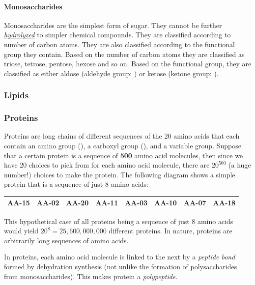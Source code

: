 \documentclass[12pt]{article}
\begin{document}
\paragraph{Monosaccharides}
Monosaccharides are the simplest form of sugar. They cannot be further \hyperref[sec: hydrolysis]{\emph{hydrolyzed}} to simpler chemical compounds. They are classified according to number of carbon atoms. They are also classified according to the functional group they contain. Based on the number of carbon atoms they are classified as triose, tetrose, pentose, hexose and so on. Based on the functional group, they are classified as either aldose (aldehyde group: ) or ketose (ketone group: ).
\subsubsection{Lipids}
\subsubsection{Proteins}
Proteins are long chains of different sequences of the 20 amino acids that each contain an amino group (), a carboxyl group (), and a variable group. Suppose that a certain protein is a sequence of \textbf{500} amino acid molecules, then since we have 20 choices to pick from for each amino acid molecule, there are $20^{500}$ (a huge number!) choices to make the protein. The following diagram shows a simple protein that is a sequence of just 8 amino acids: 
\begin{table}[htbp!]
  \begin{center}
    \begin{tabular}{|c|c|c|c|c|c|c|c|} 
      \hline
        AA-15 &
        AA-02 &
        AA-20 &
        AA-11 &
        AA-03 &
        AA-10 &
        AA-07 &
        AA-18 \\
        \hline
    \end{tabular}
  \end{center}
\end{table}
This hypothetical case of all proteins being a sequence of just 8 amino acids would yield 
$20^8=25,600,000,000$ different proteins. In nature, proteins are arbitrarily long sequences of amino acids.

In proteins, each amino acid molecule is linked to the next by a \emph{peptide bond} formed by dehydration synthesis (not unlike the formation of polysaccharides from monosaccharides). This makes protein a \emph{polypeptide}.
\end{document}
